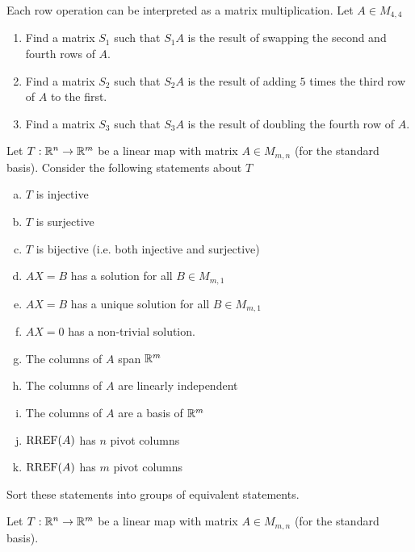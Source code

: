 
\begin{applicationActivities}{2}{22}

\begin{activity}{0}
Each row operation can be interpreted as a matrix multiplication.  Let $A \in M_{4,4}$
\begin{enumerate}[1)]
\item Find a matrix $S_1$ such that $S_1A$ is the result of swapping the second and fourth rows of $A$.
\item Find a matrix $S_2$ such that $S_2A$ is the result of adding $5$ times the third row of $A$ to the first.
\item Find a matrix $S_3$ such that $S_3A$ is the result of doubling the fourth row of $A$.
\end{enumerate}
\end{activity}


\begin{activity}{0}
Let $T: \mathbb{R}^n \rightarrow \mathbb{R}^m$ be a linear map with matrix $A \in M_{m,n}$ (for the standard basis).  Consider the following statements about $T$
\begin{enumerate}[(a)]
\item $T$ is injective
\item $T$ is surjective
\item $T$ is bijective (i.e. both injective and surjective)
\item $AX=B$ has a solution for all $B \in M_{m,1}$
\item $AX=B$ has a unique solution for all $B \in M_{m,1}$
\item $AX=0$ has a non-trivial solution.
\item The columns of $A$ span $\mathbb{R}^m$
\item The columns of $A$ are linearly independent
\item The columns of $A$ are a basis of $\mathbb{R}^m$
\item $\operatorname{RREF}(A)$ has $n$ pivot columns
\item $\operatorname{RREF}(A)$ has $m$ pivot columns
\end{enumerate}

Sort these statements into groups of equivalent statements.

\end{activity}

\begin{activity}{0}
Let $T: \mathbb{R}^n \rightarrow \mathbb{R}^m$ be a linear map with matrix $A \in M_{m,n}$ (for the standard basis).


\end{activity}
\end{applicationActivities}

